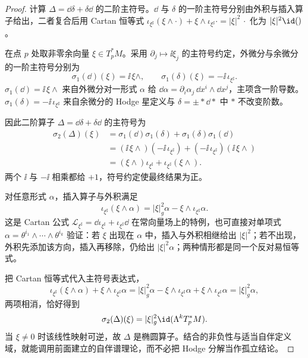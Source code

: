 \begin{proof}
计算 $\Delta=\dd\delta+\delta\dd$ 的二阶主符号。$\dd$ 与 $\delta$ 的一阶主符号分别由外积与插入算子给出，二者复合后用 Cartan 恒等式 $\iota_{\xi^\sharp}(\xi\wedge\cdot)+\xi\wedge\iota_{\xi^\sharp}\cdot=|\xi|^2\,\cdot$ 化为 $|\xi|^2\id()$。

在点 $p$ 处取非零余向量 $\xi\in T_p^*M$。采用 $\partial_j\mapsto \ii\xi_j$ 的主符号约定，外微分与余微分的一阶主符号分别为
\begin{equation*}
\sigma_1(\dd)(\xi)=\ii\,\xi\wedge,
\qquad
\sigma_1(\delta)(\xi)=-\ii\,\iota_{\xi^\sharp}.
\end{equation*}
$\sigma_1(\dd)=\ii\,\xi\wedge$ 来自外微分对一形式 $\alpha$ 给 $\dd\alpha=\partial_i\alpha_j\,\dd x^i\wedge\dd x^j$，主项含一阶导数。$\sigma_1(\delta)=-\ii\,\iota_{\xi^\sharp}$ 来自余微分的 Hodge 星定义与 $\delta=\pm *\dd*$ 中 $*$ 不改变阶数。

因此二阶算子 $\Delta=\dd\delta+\delta\dd$ 的主符号为
\begin{equation*}
\begin{aligned}
\sigma_2(\Delta)(\xi)
&=\sigma_1(\dd)\sigma_1(\delta)+\sigma_1(\delta)\sigma_1(\dd)\\
&=(\ii\,\xi\wedge)(-\ii\,\iota_{\xi^\sharp})
+(-\ii\,\iota_{\xi^\sharp})(\ii\,\xi\wedge)\\
&=(\xi\wedge)\iota_{\xi^\sharp}
+\iota_{\xi^\sharp}(\xi\wedge).
\end{aligned}
\end{equation*}
两个 $\ii$ 与 $-\ii$ 相乘都给 $+1$，符号约定使最终结果为正。

对任意形式 $\alpha$，插入算子与外积满足
\begin{equation*}
\iota_{\xi^\sharp}(\xi\wedge\alpha)
=|\xi|_g^2\alpha
-\xi\wedge\iota_{\xi^\sharp}\alpha.
\end{equation*}
这是 Cartan 公式 $\mathcal L_{\xi^\sharp}=\dd\iota_{\xi^\sharp}+\iota_{\xi^\sharp}\dd$ 在常向量场上的特例，也可直接对单项式 $\alpha=\theta^{i_1}\wedge\cdots\wedge\theta^{i_k}$ 验证：若 $\xi$ 出现在 $\alpha$ 中，插入与外积相继给出 $|\xi|^2$；若不出现，外积先添加该方向，插入再移除，仍给出 $|\xi|^2\alpha$；两种情形都是同一个反对易恒等式。

把 Cartan 恒等式代入主符号表达式，
\begin{equation*}
\iota_{\xi^\sharp}(\xi\wedge\alpha)
+\xi\wedge\iota_{\xi^\sharp}\alpha
=|\xi|_g^2\alpha
-\xi\wedge\iota_{\xi^\sharp}\alpha
+\xi\wedge\iota_{\xi^\sharp}\alpha
=|\xi|_g^2\alpha,
\end{equation*}
两项相消，恰好得到
\begin{equation}\label{eq:math-dg-hodge-principal-symbol}
{
\sigma_2(\Delta)(\xi)
=|\xi|_g^2\id(\Lambda^kT_p^*M).}
\end{equation}
当 $\xi\neq0$ 时该线性映射可逆，故 $\Delta$ 是椭圆算子。结合的非负性与适当自伴定义域，就能调用前面建立的自伴谱理论，而不必把 Hodge 分解当作孤立结论。


\end{proof}
